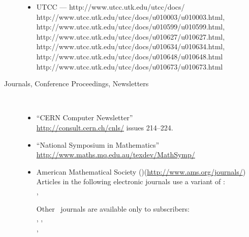 \begin{description}
\begin{itemize}
\item
UTCC --- %
{http://www.utcc.utk.edu/utcc/docs/}\\
%
{http://www.utcc.utk.edu/utcc/docs/u010003/u010003.html}, 
{http://www.utcc.utk.edu/utcc/docs/u010599/u010599.html},
{http://www.utcc.utk.edu/utcc/docs/u010627/u010627.html},
{http://www.utcc.utk.edu/utcc/docs/u010634/u010634.html},
{http://www.utcc.utk.edu/utcc/docs/u010648/u010648.html}\\
{http://www.utcc.utk.edu/utcc/docs/u010673/u010673.html}
\html{\smallskip}%


\end{itemize}


\htmlrule[50\% center]


\item [Journals, Conference Proceedings, Newsletters]~%
\begin{itemize}
%
\item ``CERN Computer Newsletter''\\
\url{http://consult.cern.ch/cnls/} issues 214--224.
\html{\smallskip}%

\item ``National Symposium in Mathematics''\\
\url{http://www.maths.mq.edu.au/texdev/MathSymp/}
\html{\smallskip}

\item
American Mathematical Society (\AmS)\quad(\url{http://www.ams.org/journals/})\\
Articles in the following electronic journals use a variant of \latextohtml{}:\\
, 
\\ 

\smallskip
Other \AmS\ journals are available only to subscribers:\\
, 
,
\\
, 


\end{itemize}
\end{description}
